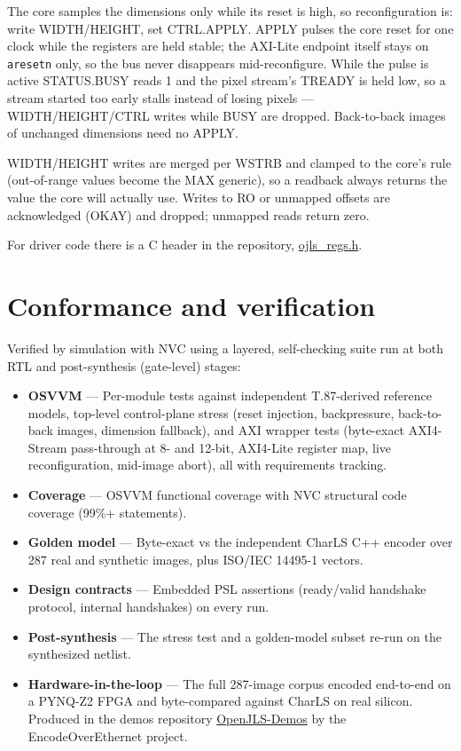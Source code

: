 \documentclass[10pt,a4paper]{article}
\begin{document}
The core samples the dimensions only while its reset is high, so reconfiguration
is: write WIDTH/HEIGHT, set CTRL.APPLY. APPLY pulses the core reset for one clock
while the registers are held stable; the AXI-Lite endpoint itself stays on
\texttt{aresetn} only, so the bus never disappears mid-reconfigure. While the
pulse is active STATUS.BUSY reads 1 and the pixel stream's TREADY is held low, so
a stream started too early stalls instead of losing pixels --- WIDTH/HEIGHT/CTRL
writes while BUSY are dropped. Back-to-back images of unchanged dimensions need
no APPLY.

WIDTH/HEIGHT writes are merged per WSTRB and clamped to the core's rule
(out-of-range values become the MAX generic), so a readback always returns the
value the core will actually use. Writes to RO or unmapped offsets are
acknowledged (OKAY) and dropped; unmapped reads return zero.

\medskip
\noindent For driver code there is a C header in the repository,
\href{https://github.com/isentropic-fpga/OpenJLS/blob/main/Sources/Xilinx/ojls_regs.h}{ojls\_regs.h}.


\section{Conformance and verification}
Verified by simulation with NVC using a layered, self-checking suite run at
both RTL and post-synthesis (gate-level) stages:
\begin{itemize}
  \item \textbf{OSVVM} --- Per-module tests against independent T.87-derived
        reference models, top-level control-plane stress (reset injection,
        backpressure, back-to-back images, dimension fallback), and AXI wrapper
        tests (byte-exact AXI4-Stream pass-through at 8- and 12-bit, AXI4-Lite
        register map, live reconfiguration, mid-image abort), all with
        requirements tracking.
  \item \textbf{Coverage} --- OSVVM functional coverage with NVC structural code coverage (99\%+ statements).
  \item \textbf{Golden model} --- Byte-exact vs the independent CharLS C++
        encoder over 287 real and synthetic images, plus ISO/IEC 14495-1 vectors.
  \item \textbf{Design contracts} --- Embedded PSL assertions (ready/valid handshake protocol, internal handshakes) on every run.
  \item \textbf{Post-synthesis} --- The stress test and a golden-model subset re-run on the synthesized netlist.
  \item \textbf{Hardware-in-the-loop} --- The full 287-image corpus encoded end-to-end on a PYNQ-Z2 FPGA and byte-compared against CharLS on real silicon. Produced in the demos repository \href{https://github.com/isentropic-fpga/OpenJLS-Demos}{OpenJLS-Demos} by the EncodeOverEthernet project.
\end{itemize}
\end{document}

